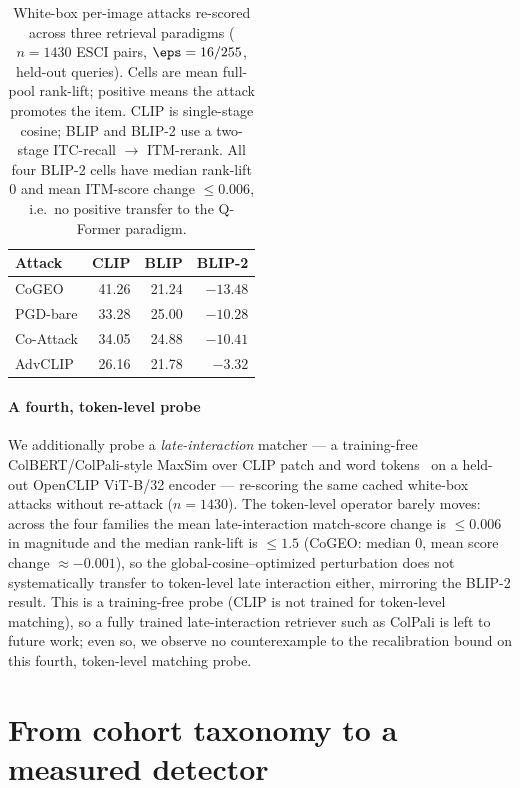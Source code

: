 \begin{table}[t]
\centering
\footnotesize
\setlength{\tabcolsep}{5pt}
\caption{White-box per-image attacks re-scored across three retrieval paradigms ($n = 1430$ ESCI pairs, $\eps = 16/255$, held-out queries). Cells are mean full-pool rank-lift; positive means the attack promotes the item. CLIP is single-stage cosine; BLIP and BLIP-2 use a two-stage ITC-recall $\to$ ITM-rerank. All four BLIP-2 cells have median rank-lift $0$ and mean ITM-score change $\leq 0.006$, i.e.\ no positive transfer to the Q-Former paradigm.}
\label{sm:tab:cross-paradigm}
\begin{tabular}{lrrr}
\toprule
Attack & CLIP & BLIP & BLIP-2 \\
\midrule
CoGEO     & 41.26 & 21.24 & $-13.48$ \\
PGD-bare  & 33.28 & 25.00 & $-10.28$ \\
Co-Attack & 34.05 & 24.88 & $-10.41$ \\
AdvCLIP   & 26.16 & 21.78 & $-3.32$ \\
\bottomrule
\end{tabular}
\end{table}

\paragraph{A fourth, token-level probe} We additionally probe a \emph{late-interaction} matcher --- a training-free ColBERT/ColPali-style MaxSim over CLIP patch and word tokens~\cite{khattab2020colbert} on a held-out OpenCLIP ViT-B/32 encoder --- re-scoring the same cached white-box attacks without re-attack ($n = 1430$). The token-level operator barely moves: across the four families the mean late-interaction match-score change is $\leq 0.006$ in magnitude and the median rank-lift is $\leq 1.5$ (CoGEO: median $0$, mean score change $\approx -0.001$), so the global-cosine--optimized perturbation does not systematically transfer to token-level late interaction either, mirroring the BLIP-2 result. This is a training-free probe (CLIP is not trained for token-level matching), so a fully trained late-interaction retriever such as ColPali is left to future work; even so, we observe no counterexample to the recalibration bound on this fourth, token-level matching probe.

\section{From cohort taxonomy to a measured detector}
\label{sm:defense}

